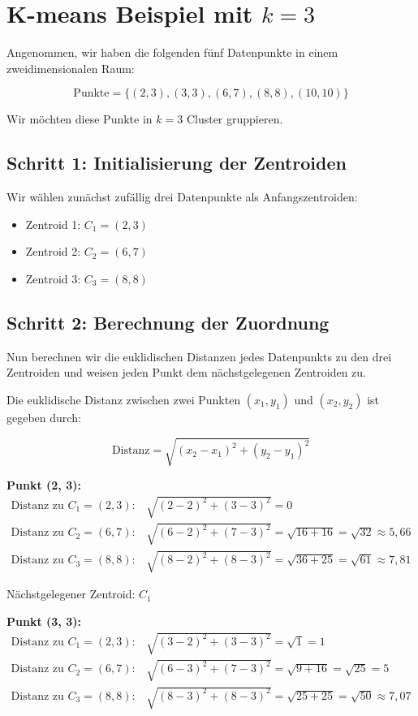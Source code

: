\documentclass{article}
\begin{document}
\section*{K-means Beispiel mit \( k = 3 \)}

Angenommen, wir haben die folgenden fünf Datenpunkte in einem zweidimensionalen Raum:

\[
\text{Punkte} = \{(2, 3), (3, 3), (6, 7), (8, 8), (10, 10)\}
\]

Wir möchten diese Punkte in \( k = 3 \) Cluster gruppieren.

\subsection*{Schritt 1: Initialisierung der Zentroiden}
Wir wählen zunächst zufällig drei Datenpunkte als Anfangszentroiden:

\begin{itemize}
    \item Zentroid 1: \( C_1 = (2, 3) \)
    \item Zentroid 2: \( C_2 = (6, 7) \)
    \item Zentroid 3: \( C_3 = (8, 8) \)
\end{itemize}

\subsection*{Schritt 2: Berechnung der Zuordnung}
Nun berechnen wir die euklidischen Distanzen jedes Datenpunkts zu den drei Zentroiden und weisen jeden Punkt dem nächstgelegenen Zentroiden zu.

Die euklidische Distanz zwischen zwei Punkten \( (x_1, y_1) \) und \( (x_2, y_2) \) ist gegeben durch:

\[
\text{Distanz} = \sqrt{(x_2 - x_1)^2 + (y_2 - y_1)^2}
\]

\textbf{Punkt (2, 3):}
\begin{align*}
\text{Distanz zu } C_1 = (2, 3): & \quad \sqrt{(2-2)^2 + (3-3)^2} = 0 \\
\text{Distanz zu } C_2 = (6, 7): & \quad \sqrt{(6-2)^2 + (7-3)^2} = \sqrt{16 + 16} = \sqrt{32} \approx 5{,}66 \\
\text{Distanz zu } C_3 = (8, 8): & \quad \sqrt{(8-2)^2 + (8-3)^2} = \sqrt{36 + 25} = \sqrt{61} \approx 7{,}81
\end{align*}

Nächstgelegener Zentroid: \( C_1 \)

\textbf{Punkt (3, 3):}
\begin{align*}
\text{Distanz zu } C_1 = (2, 3): & \quad \sqrt{(3-2)^2 + (3-3)^2} = \sqrt{1} = 1 \\
\text{Distanz zu } C_2 = (6, 7): & \quad \sqrt{(6-3)^2 + (7-3)^2} = \sqrt{9 + 16} = \sqrt{25} = 5 \\
\text{Distanz zu } C_3 = (8, 8): & \quad \sqrt{(8-3)^2 + (8-3)^2} = \sqrt{25 + 25} = \sqrt{50} \approx 7{,}07
\end{align*}
\end{document}
